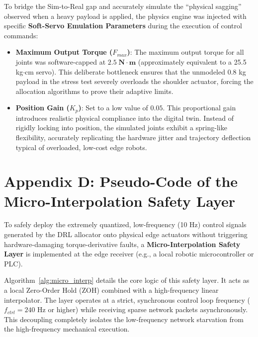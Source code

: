 To bridge the Sim-to-Real gap and accurately simulate the ``physical sagging'' observed when a heavy payload is applied, the physics engine was injected with specific \textbf{Soft-Servo Emulation Parameters} during the execution of control commands:
\begin{itemize}
    \item \textbf{Maximum Output Torque ($F_{max}$)}: The maximum output torque for all joints was software-capped at $2.5\;\mathbf{N\cdot m}$  (approximately equivalent to a 25.5 kg$\cdot$cm servo). This deliberate bottleneck ensures that the unmodeled $0.8$ kg payload in the stress test severely overloads the shoulder actuator, forcing the allocation algorithms to prove their adaptive limits.
    \item \textbf{Position Gain ($K_p$)}: Set to a low value of $0.05$. This proportional gain introduces realistic physical compliance into the digital twin. Instead of rigidly locking into position, the simulated joints exhibit a spring-like flexibility, accurately replicating the hardware jitter and trajectory deflection typical of overloaded, low-cost edge robots.
\end{itemize}
\section{Appendix D: Pseudo-Code of the Micro-Interpolation Safety Layer}
To safely deploy the extremely quantized, low-frequency (10 Hz) control signals generated by the DRL allocator onto physical edge actuators without triggering hardware-damaging torque-derivative faults, a
\textbf{Micro-Interpolation Safety Layer} is implemented at the edge receiver (e.g., a local robotic microcontroller or PLC).

Algorithm~\ref{alg:micro_interp} details the core logic of this safety layer. It acts as a local Zero-Order Hold (ZOH) combined with a high-frequency linear interpolator. 
The layer operates at a strict, synchronous control loop frequency ($f_{ctrl} = 240$ Hz or higher) while receiving sparse network packets asynchronously. 
This decoupling completely isolates the low-frequency network starvation from the high-frequency mechanical execution.

